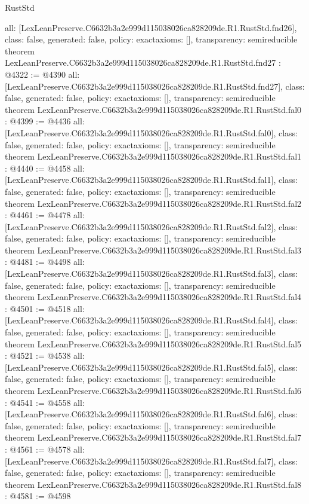\begin{lexlean}{RustStd}
\begin{coremodule}
{  all: [LexLeanPreserve.C6632b3a2e999d115038026ca828209de.R1.RustStd.fnd26],
  class: false,
  generated: false,
  policy: exact{axioms: []},
  transparency: semireducible
}
theorem LexLeanPreserve.C6632b3a2e999d115038026ca828209de.R1.RustStd.fnd27 : @4322 := @4390 {
  all: [LexLeanPreserve.C6632b3a2e999d115038026ca828209de.R1.RustStd.fnd27],
  class: false,
  generated: false,
  policy: exact{axioms: []},
  transparency: semireducible
}
theorem LexLeanPreserve.C6632b3a2e999d115038026ca828209de.R1.RustStd.fal0 : @4399 := @4436 {
  all: [LexLeanPreserve.C6632b3a2e999d115038026ca828209de.R1.RustStd.fal0],
  class: false,
  generated: false,
  policy: exact{axioms: []},
  transparency: semireducible
}
theorem LexLeanPreserve.C6632b3a2e999d115038026ca828209de.R1.RustStd.fal1 : @4440 := @4458 {
  all: [LexLeanPreserve.C6632b3a2e999d115038026ca828209de.R1.RustStd.fal1],
  class: false,
  generated: false,
  policy: exact{axioms: []},
  transparency: semireducible
}
theorem LexLeanPreserve.C6632b3a2e999d115038026ca828209de.R1.RustStd.fal2 : @4461 := @4478 {
  all: [LexLeanPreserve.C6632b3a2e999d115038026ca828209de.R1.RustStd.fal2],
  class: false,
  generated: false,
  policy: exact{axioms: []},
  transparency: semireducible
}
theorem LexLeanPreserve.C6632b3a2e999d115038026ca828209de.R1.RustStd.fal3 : @4481 := @4498 {
  all: [LexLeanPreserve.C6632b3a2e999d115038026ca828209de.R1.RustStd.fal3],
  class: false,
  generated: false,
  policy: exact{axioms: []},
  transparency: semireducible
}
theorem LexLeanPreserve.C6632b3a2e999d115038026ca828209de.R1.RustStd.fal4 : @4501 := @4518 {
  all: [LexLeanPreserve.C6632b3a2e999d115038026ca828209de.R1.RustStd.fal4],
  class: false,
  generated: false,
  policy: exact{axioms: []},
  transparency: semireducible
}
theorem LexLeanPreserve.C6632b3a2e999d115038026ca828209de.R1.RustStd.fal5 : @4521 := @4538 {
  all: [LexLeanPreserve.C6632b3a2e999d115038026ca828209de.R1.RustStd.fal5],
  class: false,
  generated: false,
  policy: exact{axioms: []},
  transparency: semireducible
}
theorem LexLeanPreserve.C6632b3a2e999d115038026ca828209de.R1.RustStd.fal6 : @4541 := @4558 {
  all: [LexLeanPreserve.C6632b3a2e999d115038026ca828209de.R1.RustStd.fal6],
  class: false,
  generated: false,
  policy: exact{axioms: []},
  transparency: semireducible
}
theorem LexLeanPreserve.C6632b3a2e999d115038026ca828209de.R1.RustStd.fal7 : @4561 := @4578 {
  all: [LexLeanPreserve.C6632b3a2e999d115038026ca828209de.R1.RustStd.fal7],
  class: false,
  generated: false,
  policy: exact{axioms: []},
  transparency: semireducible
}
theorem LexLeanPreserve.C6632b3a2e999d115038026ca828209de.R1.RustStd.fal8 : @4581 := @4598 {
}
\end{coremodule}
\end{lexlean}
